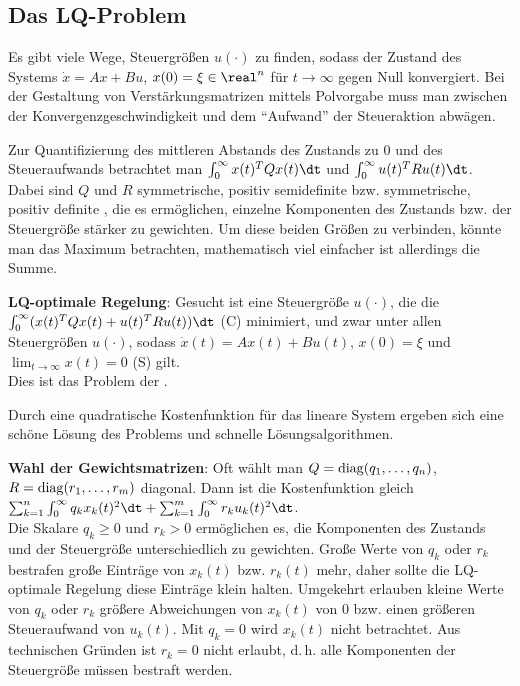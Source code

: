 \pagebreak

\subsection{%
    Das LQ-Problem%
}

Es gibt viele Wege, Steuergrößen $u(\cdot)$ zu finden, sodass der Zustand des Systems
$\dot{x} = Ax + Bu$, $x(0) = \xi \in \real^n$ für $t \to \infty$ gegen Null konvergiert.
Bei der Gestaltung von Verstärkungsmatrizen mittels Polvorgabe muss man zwischen der
Konvergenzgeschwindigkeit und dem "`Aufwand"' der Steueraktion abwägen.

Zur Quantifizierung des mittleren Abstands des Zustands zu $0$ und des Steueraufwands
betrachtet man $\int_0^\infty x(t)^T Qx(t)\dt$ und $\int_0^\infty u(t)^T Ru(t)\dt$.
Dabei sind $Q$ und $R$ symmetrische, positiv semidefinite bzw. symmetrische, positiv definite
, die es ermöglichen, einzelne Komponenten des Zustands bzw. der
Steuergröße stärker zu gewichten.
Um diese beiden Größen zu verbinden, könnte man das Maximum betrachten, mathematisch
viel einfacher ist allerdings die Summe.

\textbf{LQ-optimale Regelung}:
Gesucht ist eine Steuergröße $u(\cdot)$, die die \\
$\int_0^\infty (x(t)^T Qx(t) + u(t)^T Ru(t))\dt$ (C) minimiert,
und zwar unter allen Steuergrößen $u(\cdot)$, sodass
$\dot{x}(t) = Ax(t) + Bu(t)$, $x(0) = \xi$ und $\lim_{t \to \infty} x(t) = 0$ (S) gilt.\\
Dies ist das Problem der
.

Durch eine quadratische Kostenfunktion für das lineare System ergeben sich eine schöne Lösung des
Problems und schnelle Lösungsalgorithmen.

\linie

\textbf{Wahl der Gewichtsmatrizen}:
Oft wählt man $Q = \operatorname{diag}(q_1, \dotsc, q_n)$, $R = \operatorname{diag}(r_1, \dotsc, r_m)$ diagonal.
Dann ist die Kostenfunktion gleich
$\sum_{k=1}^n \int_0^\infty q_k x_k(t)^2\dt + \sum_{k=1}^m \int_0^\infty r_k u_k(t)^2\dt$.\\
Die Skalare $q_k \ge 0$ und $r_k > 0$ ermöglichen es, die Komponenten des Zustands und der
Steuergröße unterschiedlich zu gewichten.
Große Werte von $q_k$ oder $r_k$ bestrafen große Einträge von $x_k(t)$ bzw. $r_k(t)$ mehr,
daher sollte die LQ-optimale Regelung diese Einträge klein halten.
Umgekehrt erlauben kleine Werte von $q_k$ oder $r_k$ größere Abweichungen von $x_k(t)$ von $0$
bzw. einen größeren Steueraufwand von $u_k(t)$.
Mit $q_k = 0$ wird $x_k(t)$ nicht betrachtet.
Aus technischen Gründen ist $r_k = 0$ nicht erlaubt, d.\,h. alle Komponenten der Steuergröße
müssen bestraft werden.

